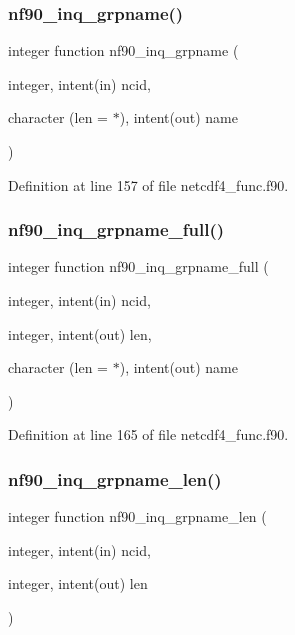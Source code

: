 \subsubsection{\texorpdfstring{nf90\+\_\+inq\+\_\+grpname()}{nf90\_inq\_grpname()}}
{\footnotesize\ttfamily integer function nf90\+\_\+inq\+\_\+grpname (\begin{DoxyParamCaption}\item[{integer, intent(in)}]{ncid,  }\item[{character (len = $\ast$), intent(out)}]{name }\end{DoxyParamCaption})}



Definition at line 157 of file netcdf4\+\_\+func.\+f90.

\mbox{\label{netcdf4__func_8f90_a336d772c3bcd96d159a81664ca3c3f80}} 
\subsubsection{\texorpdfstring{nf90\+\_\+inq\+\_\+grpname\+\_\+full()}{nf90\_inq\_grpname\_full()}}
{\footnotesize\ttfamily integer function nf90\+\_\+inq\+\_\+grpname\+\_\+full (\begin{DoxyParamCaption}\item[{integer, intent(in)}]{ncid,  }\item[{integer, intent(out)}]{len,  }\item[{character (len = $\ast$), intent(out)}]{name }\end{DoxyParamCaption})}



Definition at line 165 of file netcdf4\+\_\+func.\+f90.

\mbox{\label{netcdf4__func_8f90_a7ee0183b26ec2642a5ab0542ec26d0ad}} 
\subsubsection{\texorpdfstring{nf90\+\_\+inq\+\_\+grpname\+\_\+len()}{nf90\_inq\_grpname\_len()}}
{\footnotesize\ttfamily integer function nf90\+\_\+inq\+\_\+grpname\+\_\+len (\begin{DoxyParamCaption}\item[{integer, intent(in)}]{ncid,  }\item[{integer, intent(out)}]{len }\end{DoxyParamCaption})}



